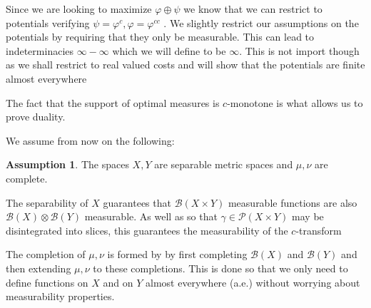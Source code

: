 \documentclass[
    a4paper,
    DIV=14,
    abstract=true,
    numbers=noenddot
]
{scrartcl}
\theoremstyle{definition}
\newtheorem{assumption}{Assumption}
\newcommand{\liamtodo}[1]{\todo[inline,color=darkgreen!40]{Liam: #1}}
\newcommand{\Bb}{\mathcal{B}}
\newcommand{\Pp}{\mathcal{P}}
\begin{document}
Since we are looking to maximize $\varphi \oplus \psi $ we know that we can restrict to potentials verifying $\psi =\varphi ^c , \varphi = \varphi ^{cc}$ \liamtodo{Can we keep going?}. We slightly restrict our assumptions on the potentials by requiring that they only be measurable. This can lead to indeterminacies $\infty-\infty$ which we will define to be $\infty$. This is not import though as we shall restrict to real valued costs and will show that the potentials are finite almost everywhere


The fact that the support of optimal measures is $c$-monotone is what allows us to prove duality.



We assume from now on the following:
\begin{assumption}
    The spaces $X,Y$ are separable metric spaces and $\mu, \nu $ are complete.
\end{assumption}
The separability of $X$ guarantees that $\Bb (X\times Y) $ measurable functions are also $\Bb (X)\otimes \Bb (Y)$ measurable. As well as so that $\gamma \in \Pp (X\times Y)$ may be disintegrated into slices, this guarantees the measurability of the $c$-transform

The completion of $\mu , \nu $ is formed by by first completing $ \Bb (X)$ and $ \Bb (Y)$ and then extending $\mu , \nu $ to these completions. This is done so that we only need to define functions on $X$ and on $Y$  almost everywhere (a.e.) without worrying about measurability properties.
\end{document}
